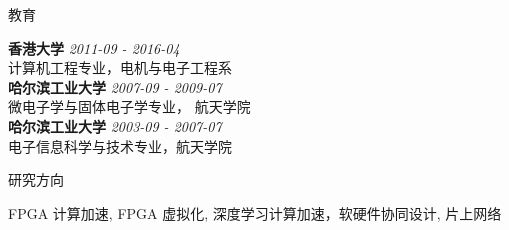 \documentclass{resume} %
\begin{document}
\begin{rSection}{教育}

{\bf 香港大学} \hfill {\em 2011-09 - 2016-04} \\ 
计算机工程专业，电机与电子工程系\\
{\bf 哈尔滨工业大学} \hfill {\em 2007-09 - 2009-07} \\
微电子学与固体电子学专业， 航天学院\\
{\bf 哈尔滨工业大学} \hfill {\em 2003-09 - 2007-07} \\
电子信息科学与技术专业，航天学院 \\

\end{rSection}

\begin{rSection}{研究方向}
    \vspace{-1em}
\item FPGA 计算加速, FPGA 虚拟化, 深度学习计算加速，软硬件协同设计, 片上网络
    \vspace{-0.5em}
\end{rSection}
\end{document}
